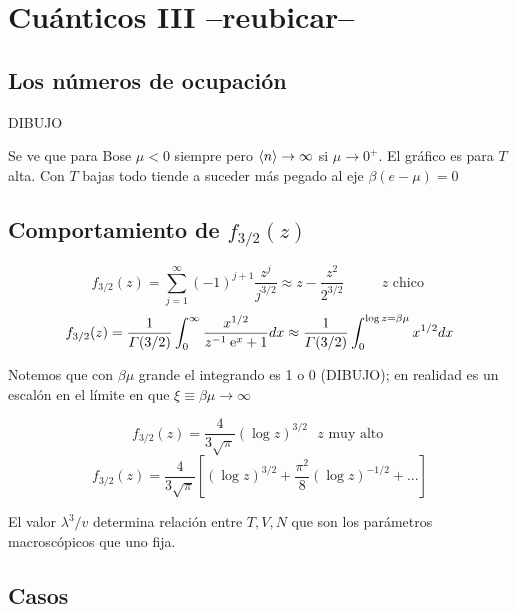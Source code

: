 \documentclass[10pt,oneside]{CBFT_book}
\begin{document}
\section{Cuánticos III --reubicar--}
 
 \subsection{Los números de ocupación}
 
 DIBUJO
 
 Se ve que para Bose $ \mu < 0 $ siempre pero $ \braket{n} \to \infty $ si $ \mu \to 0^+ $.
 El gráfico es para $T$ alta. Con $ T $ bajas todo tiende a suceder más pegado al eje $ \beta(e-\mu) = 0 $
 
 \subsection{Comportamiento de $ f_{3/2}(z) $}
 
 \[
	f_{3/2}(z) = \sum_{j=1}^\infty (-1)^{j+1}\frac{z^j}{j^{3/2}} \approx z - \frac{z^2}{2^{3/2}} \qquad 
	\text{ $z$ chico }
 \]
 \[
 	f_{3/2}(z) = \frac{1}{\Gamma(3/2)} \int_0^\infty \frac{x^{1/2}}{z^{-1}\:\mathrm{e}^{x} + 1} dx \approx  
 	\frac{1}{\Gamma(3/2)} \int_0^{\log z = \beta\mu} x^{1/2} dx
 \]
 
Notemos que con $ \beta \mu $ grande el integrando es 1 o 0 (DIBUJO); en realidad es un escalón en el límite
en que $ \xi \equiv \beta\mu \to \infty$

\[
	f_{3/2}(z) = \frac{4}{ 3 \sqrt{\pi} } (\log z )^{3/2} \text{ $z$ muy alto }
\]
\[
	f_{3/2}(z) = \frac{4}{ 3 \sqrt{\pi} } \left[ (\log z )^{3/2} + \frac{\pi^2}{8}(\log z )^{-1/2} + ... \right]
\]

El valor $ \lambda^3 / v $ determina relación entre $ T,V,N $ que son los parámetros macroscópicos que uno fija.

\subsection{Casos}
\end{document}
